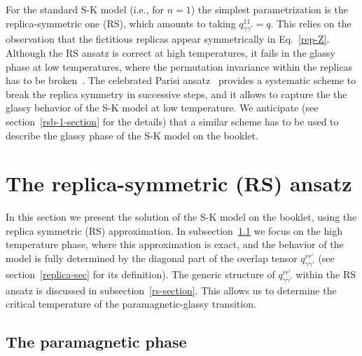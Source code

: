 \documentclass[twocolumn,superscriptaddress,prb,10pt]{revtex4-1}
\begin{document}
For the standard S-K model (i.e., for $n=1$) the simplest parametrization is the 
replica-symmetric one (RS), which amounts to taking $q^{11}_{\gamma\gamma'}=q$. 
This relies on the observation that the fictitious replicas appear symmetrically 
in Eq.~\eqref{rep-Z}. Although the RS ansatz is correct at high temperatures, it 
fails in the glassy phase at low temperatures, where the permutation invariance 
within the replicas has to be broken~\cite{almeida-1978}. The celebrated Parisi 
ansatz~\cite{parisi-1979} provides a systematic scheme to break the replica 
symmetry in successive steps, and it allows to capture the the glassy behavior of 
the S-K model at low temperature. We anticipate (see section~\ref{rsb-1-section} for 
the details) that a similar scheme has to be used to describe the glassy phase of 
the S-K model on the booklet. 


\section{The replica-symmetric (RS) ansatz}
\label{solution}

In this section we present the solution of the S-K model on the booklet, using 
the replica symmetric (RS) approximation. In subsection~\ref{para-section} we focus 
on the high temperature phase, where this approximation is exact, and the 
behavior of the model is fully determined by the diagonal part of the overlap 
tensor $q_{\gamma\gamma'}^{rr'}$ (see section~\ref{replica-sec} for its 
definition). The generic structure of $q_{\gamma\gamma'}^{rr'}$ 
within the RS ansatz  is discussed in subsection~\ref{rs-section}. This allows us 
to determine the critical temperature of the paramagnetic-glassy transition. 

\subsection{The paramagnetic phase}
\label{para-section}
\end{document}
